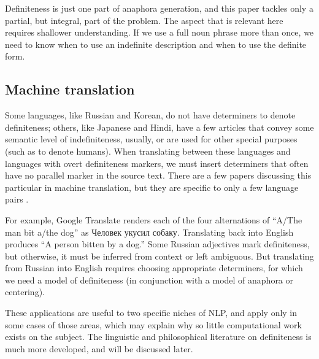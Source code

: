 \documentclass[11pt]{article}\usepackage{graphicx, color}
\begin{document}
Definiteness is just one part of anaphora generation, and this paper tackles only a partial, but integral, part of the problem. The aspect that is relevant here requires shallower understanding. If we use a full noun phrase more than once, we need to know when to use an indefinite description and when to use the definite form.



\subsection{Machine translation}

Some languages, like Russian and Korean, do not have determiners to denote definiteness; others, like Japanese and Hindi, have a few articles that convey some semantic level of indefiniteness, usually, or are used for other special purposes (such as to denote humans). %
When translating between these languages and languages with overt definiteness markers, we must insert determiners that often have no parallel marker in the source text.
There are a few papers discussing this particular in machine translation, but they are specific to only a few language pairs \citep{ishikawa:1995, siegel:1996}.

For example, Google Translate renders each of the four alternations of ``A/The man bit a/the dog'' as \foreignlanguage{russian}{Человек укусил собаку.} Translating back into English produces ``A person bitten by a dog.'' Some Russian adjectives mark definiteness, but otherwise, it must be inferred from context or left ambiguous. But translating from Russian into English requires choosing appropriate determiners, for which we need a model of definiteness (in conjunction with a model of anaphora or centering).

\smallskip
These applications are useful to two specific niches of NLP, and apply only in some cases of those areas,
which may explain why so little computational work exists on the subject.
The linguistic and philosophical literature on definiteness is much more developed, and will be discussed later.












\end{document}
